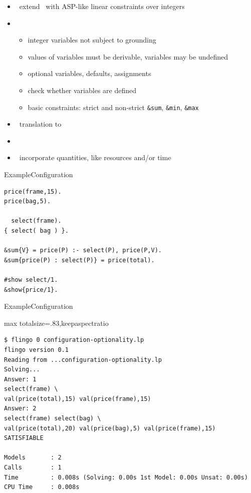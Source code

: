 \begin{frame}{\flingo}
  \begin{itemize}
  \item {} \ extend \clingo\ with ASP-like linear constraints over integers
  \item {} \
    \begin{itemize}
    \item integer variables not subject to grounding
    \item values of variables must be derivable, variables may be undefined
    \item optional variables, defaults, assignments
    \item check whether variables are defined
    \item basic constraints: strict and non-strict \lstinline{&sum}, \lstinline{&min}, \lstinline{&max}
    \end{itemize}
  \item {} \ translation to \clingcon
  \item {} \ \cite{cafascwa20a,cafascwa20b}
  \item {} \ incorporate quantities, like resources and/or time
  \end{itemize}
\end{frame}
\begin{frame}[fragile]{Example}{Configuration}
\begin{lstlisting}
price(frame,15).
price(bag,5).

  select(frame).
{ select( bag ) }.

&sum{V} = price(P) :- select(P), price(P,V).
&sum{price(P) : select(P)} = price(total).

#show select/1.
&show{price/1}.
\end{lstlisting}
\end{frame}
\begin{frame}[fragile]{Example}{Configuration}
\begin{adjustbox}{max totalsize={\textwidth}{.83\textheight},keepaspectratio}
\begin{lstlisting}
$ flingo 0 configuration-optionality.lp
flingo version 0.1
Reading from ...configuration-optionality.lp
Solving...
Answer: 1
select(frame) \
val(price(total),15) val(price(frame),15)
Answer: 2
select(frame) select(bag) \
val(price(total),20) val(price(bag),5) val(price(frame),15)
SATISFIABLE

Models       : 2
Calls        : 1
Time         : 0.008s (Solving: 0.00s 1st Model: 0.00s Unsat: 0.00s)
CPU Time     : 0.008s
\end{lstlisting}
\end{adjustbox}
\end{frame}
%

